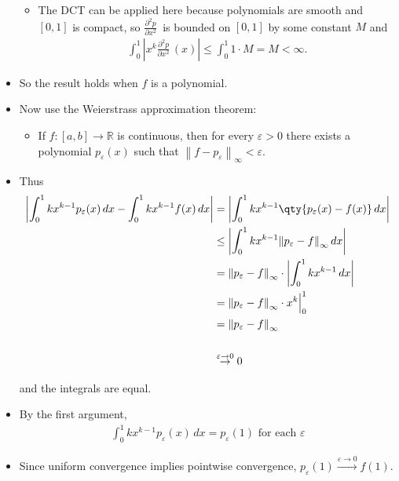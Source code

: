 \begin{solution}
\begin{itemize}
  \begin{itemize}
  \tightlist
  \item
    The DCT can be applied here because polynomials are smooth and
    \([0, 1]\) is compact, so \({\frac{\partial ^2 p}{\partial x^2}\,}\)
    is bounded on \([0, 1]\) by some constant \(M\) and
    \begin{align*} \int_0^1 {\left\lvert {x^k {\frac{\partial ^2 p}{\partial x^2}\,} (x)} \right\rvert} \leq \int_0^1 1\cdot M = M < \infty.\end{align*}
  \end{itemize}
\item
  So the result holds when \(f\) is a polynomial.
\item
  Now use the Weierstrass approximation theorem:

  \begin{itemize}
  \tightlist
  \item
    If \(f: [a, b] \to {\mathbb{R}}\) is continuous, then for every
    \(\varepsilon>0\) there exists a polynomial \(p_\varepsilon(x)\)
    such that
    \({\left\lVert {f - p_\varepsilon} \right\rVert}_\infty < \varepsilon\).
  \end{itemize}
\item
  Thus
  \begin{align*}
  {\left\lvert { \int_0^1 kx^{k-1} p_\varepsilon(x)\,dx - \int_0^1 kx^{k-1}f(x)\,dx  } \right\rvert} 
  &= {\left\lvert { \int_0^1 kx^{k-1} \qty{p_\varepsilon(x) - f(x)} \,dx  } \right\rvert} \\
  &\leq {\left\lvert { \int_0^1 kx^{k-1} {\left\lVert {p_\varepsilon-f} \right\rVert}_\infty \,dx  } \right\rvert} \\
  &= {\left\lVert {p_\varepsilon-f} \right\rVert}_\infty \cdot {\left\lvert { \int_0^1 kx^{k-1} \,dx  } \right\rvert} \\
  &= {\left\lVert {p_\varepsilon-f} \right\rVert}_\infty \cdot x^k \Big|_0^1 \\
  &= {\left\lVert {p_\varepsilon-f} \right\rVert}_\infty \\ \\
  &\overset{\varepsilon\to 0}\to 0
  \end{align*}

  and the integrals are equal.
\item
  By the first argument,
  \begin{align*}\int_0^1 kx^{k-1} p_\varepsilon(x) \,dx = p_\varepsilon(1) \text{ for each } \varepsilon\end{align*}
\item
  Since uniform convergence implies pointwise convergence,
  \(p_\varepsilon(1) \overset{\varepsilon\to 0}\to f(1)\).
\end{itemize}

\end{solution}

